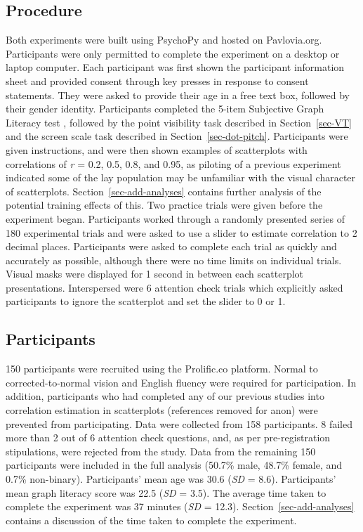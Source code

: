 \documentclass[manuscript, review, anonymous, screen]{acmart}
\begin{document}
\hypertarget{sec-gen-procedure}{%
\subsection{Procedure}\label{sec-gen-procedure}}

Both experiments were built using PsychoPy \citep{pierce_2019} and
hosted on Pavlovia.org. Participants were only permitted to complete the
experiment on a desktop or laptop computer. Each participant was first
shown the participant information sheet and provided consent through key
presses in response to consent statements. They were asked to provide
their age in a free text box, followed by their gender identity.
Participants completed the 5-item Subjective Graph Literacy test
\citep{garcia_2016}, followed by the point visibility task described in
Section~\ref{sec-VT} and the screen scale task described in
Section~\ref{sec-dot-pitch}. Participants were given instructions, and
were then shown examples of scatterplots with correlations of \emph{r} =
0.2, 0.5, 0.8, and 0.95, as piloting of a previous experiment indicated
some of the lay population may be unfamiliar with the visual character
of scatterplots. Section~\ref{sec-add-analyses} contains further
analysis of the potential training effects of this. Two practice trials
were given before the experiment began. Participants worked through a
randomly presented series of 180 experimental trials and were asked to
use a slider to estimate correlation to 2 decimal places. Participants
were asked to complete each trial as quickly and accurately as possible,
although there were no time limits on individual trials. Visual masks
were displayed for 1 second in between each scatterplot presentations.
Interspersed were 6 attention check trials which explicitly asked
participants to ignore the scatterplot and set the slider to 0 or 1.

\hypertarget{sec-participants}{%
\subsection{Participants}\label{sec-participants}}

150 participants were recruited using the Prolific.co platform. Normal
to corrected-to-normal vision and English fluency were required for
participation. In addition, participants who had completed any of our
previous studies into correlation estimation in scatterplots (references
removed for anon) were prevented from participating. Data were collected
from 158 participants. 8 failed more than 2 out of 6 attention check
questions, and, as per pre-registration stipulations, were rejected from
the study. Data from the remaining 150 participants were included in the
full analysis (50.7\% male, 48.7\% female, and 0.7\% non-binary).
Participants' mean age was 30.6 (\emph{SD} = 8.6). Participants' mean
graph literacy score was 22.5 (\emph{SD} = 3.5). The average time taken
to complete the experiment was 37 minutes (\emph{SD} = 12.3).
Section~\ref{sec-add-analyses} contains a discussion of the time taken
to complete the experiment.
\end{document}
